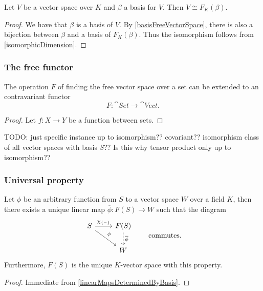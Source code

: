 \begin{lemma}
Let $V$ be a vector space over $K$ and $\beta$ a basis for $V$. Then $V\cong  F_K(\beta)$.
\end{lemma}
\begin{proof}
We have that $\beta$ is a basis of $V$. By \ref{basisFreeVectorSpace}, there is also a bijection between $\beta$ and a basis of $F_K(\beta)$. Thus the isomorphism follows from \ref{isomorphicDimension}.
\end{proof}

\subsubsection{The free functor}
\begin{proposition}
The operation $F$ of finding the free vector space over a set can be extended to an contravariant functor
\[ F: \cat{Set} \to \cat{Vect}. \]
\end{proposition}
\begin{proof}
Let $f:X\to Y$ be a function between sets.
\end{proof}
TODO: just specific instance up to isomorphism?? covariant?? isomorphism class of all vector spaces with basis $S$?? Is this why tensor product only up to isomorphism??

\subsubsection{Universal property}
\begin{proposition} \label{universalPropertyFreeVectorSpace}
Let $\phi$ be an arbitrary function from $S$ to a vector space $W$ over a field $K$, then there exists a unique linear map $\overline{\phi}: F(S)\to W$ such that the diagram
\[ \begin{tikzcd}
S \ar[r,"\charFunc{\{-\}}"] \ar[dr,"\phi"] & F(S) \ar[d,dashed,"\overline{\phi}"] \\
& W
\end{tikzcd} \qquad \text{commutes.} \]
Furthermore, $F(S)$ is the unique $K$-vector space with this property.
\end{proposition}
\begin{proof}
Immediate from \ref{linearMapsDeterminedByBasis}.
\end{proof}

